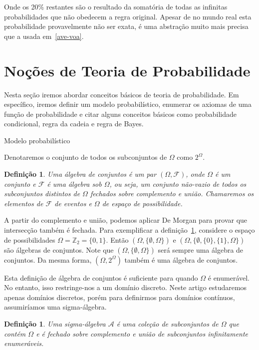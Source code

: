 \documentclass{amsart}
\makeatletter
\def\subsection{\@startsection{subsection}{3}%
  \z@{.5\linespacing\@plus.7\linespacing}{.1\linespacing}%
  {\normalfont\itshape}}
\theoremstyle{plain}
\newcounter{dummy-def}\numberwithin{dummy-def}{subsection}
\newtheorem{definition}[dummy-def]{Definição}
\newcounter{dummy-thm}\numberwithin{dummy-thm}{subsection}
\newcounter{dummy-prop}\numberwithin{dummy-prop}{subsection}
\newcounter{dummy-ex}\numberwithin{dummy-ex}{subsection}
\newcounter{dummy-eg}\numberwithin{dummy-eg}{subsection}
\numberwithin{equation}{subsection}
\makeatother
\begin{document}
Onde os 20\% restantes são o resultado da somatória de todas as infinitas probabilidades que não
obedecem a regra original. Apesar de no mundo real esta probabilidade provavelmente não ser exata,
é uma abstração muito mais precisa que a usada em~\ref{ave-voa}.

\section{Noções de Teoria de Probabilidade}

Nesta seção iremos abordar conceitos básicos de teoria de probabilidade. Em específico, iremos
definir um modelo probabilístico, enumerar os axiomas de uma função de probabilidade e citar alguns
conceitos básicos como probabilidade condicional, regra da cadeia e regra de Bayes.

\subsection{Modelo probabilístico}

Denotaremos o conjunto de todos os subconjuntos de $\Omega$ como $2^\Omega$.

\begin{definition}\label{field-sets}
  Uma álgebra de conjuntos é um par $(\Omega,\mathcal{F})$, onde $\Omega$ é um conjunto e
  $\mathcal{F}$ é uma álgebra sob $\Omega$, ou seja, um conjunto não-vazio de todos os subconjuntos
  distintos de $\Omega$ fechados sobre complemento e união. Chamaremos os elementos de
  $\mathcal{F}$ de eventos e $\Omega$ de espaço de possibilidade.
\end{definition}

A partir do complemento e união, podemos aplicar De Morgan para provar que intersecção também é
fechada. Para exemplificar a definição~\ref{field-sets}, considere o espaço de possibilidades
$\Omega=\mathbb{Z}_2=\{0,1\}$. Então $(\Omega,\{\emptyset,\Omega\})$ e $(\Omega,\{\emptyset,\{0\},
\{1\},\Omega\})$ são álgebras de conjuntos. Note que $(\Omega,\{\emptyset,\Omega\})$ será sempre
uma álgebra de conjuntos. Da mesma forma, $(\Omega,2^\Omega)$ também é uma álgebra de conjuntos.

Esta definição de álgebra de conjuntos é suficiente para quando $\Omega$ é enumerável. No entanto,
isso restringe-nos a um domínio discreto. Neste artigo estudaremos apenas domínios discretos,
porém para definirmos para domínios contínuos, assumiríamos uma sigma-álgebra.

\begin{definition}
  Uma sigma-álgebra $\mathcal{A}$ é uma coleção de subconjuntos de $\Omega$ que contém $\Omega$ e
  é fechado sobre complemento e união de subconjuntos infinitamente enumeráveis.
\end{definition}
\end{document}
